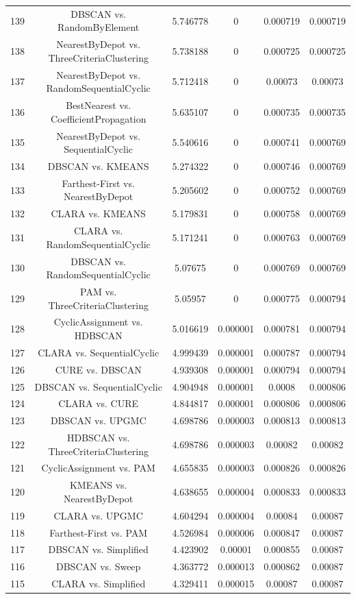 \documentclass[a4paper,10pt]{article}
\begin{document}
\begin{landscape}
\begin{table}[!htp]
\begin{tabular}{cccccc}
139&DBSCAN vs. RandomByElement&5.746778&0&0.000719&0.000719\\
138&NearestByDepot vs. ThreeCriteriaClustering&5.738188&0&0.000725&0.000725\\
137&NearestByDepot vs. RandomSequentialCyclic&5.712418&0&0.00073&0.00073\\
136&BestNearest vs. CoefficientPropagation&5.635107&0&0.000735&0.000735\\
135&NearestByDepot vs. SequentialCyclic&5.540616&0&0.000741&0.000769\\
134&DBSCAN vs. KMEANS&5.274322&0&0.000746&0.000769\\
133&Farthest-First vs. NearestByDepot&5.205602&0&0.000752&0.000769\\
132&CLARA vs. KMEANS&5.179831&0&0.000758&0.000769\\
131&CLARA vs. RandomSequentialCyclic&5.171241&0&0.000763&0.000769\\
130&DBSCAN vs. RandomSequentialCyclic&5.07675&0&0.000769&0.000769\\
129&PAM vs. ThreeCriteriaClustering&5.05957&0&0.000775&0.000794\\
128&CyclicAssignment vs. HDBSCAN&5.016619&0.000001&0.000781&0.000794\\
127&CLARA vs. SequentialCyclic&4.999439&0.000001&0.000787&0.000794\\
126&CURE vs. DBSCAN&4.939308&0.000001&0.000794&0.000794\\
125&DBSCAN vs. SequentialCyclic&4.904948&0.000001&0.0008&0.000806\\
124&CLARA vs. CURE&4.844817&0.000001&0.000806&0.000806\\
123&DBSCAN vs. UPGMC&4.698786&0.000003&0.000813&0.000813\\
122&HDBSCAN vs. ThreeCriteriaClustering&4.698786&0.000003&0.00082&0.00082\\
121&CyclicAssignment vs. PAM&4.655835&0.000003&0.000826&0.000826\\
120&KMEANS vs. NearestByDepot&4.638655&0.000004&0.000833&0.000833\\
119&CLARA vs. UPGMC&4.604294&0.000004&0.00084&0.00087\\
118&Farthest-First vs. PAM&4.526984&0.000006&0.000847&0.00087\\
117&DBSCAN vs. Simplified&4.423902&0.00001&0.000855&0.00087\\
116&DBSCAN vs. Sweep&4.363772&0.000013&0.000862&0.00087\\
115&CLARA vs. Simplified&4.329411&0.000015&0.00087&0.00087\\

\end{tabular}
\end{table}
\end{landscape}
\end{document}
